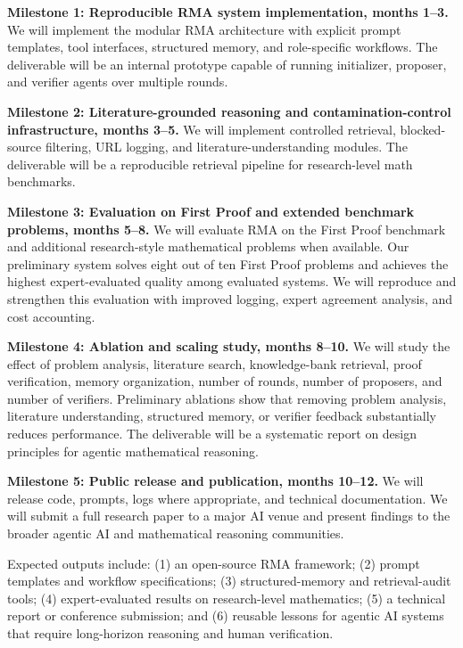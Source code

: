 \documentclass[11pt]{article}
\begin{document}
\textbf{Milestone 1: Reproducible RMA system implementation, months 1--3.} We will implement the modular RMA architecture with explicit prompt templates, tool interfaces, structured memory, and role-specific workflows. The deliverable will be an internal prototype capable of running initializer, proposer, and verifier agents over multiple rounds.

\textbf{Milestone 2: Literature-grounded reasoning and contamination-control infrastructure, months 3--5.} We will implement controlled retrieval, blocked-source filtering, URL logging, and literature-understanding modules. The deliverable will be a reproducible retrieval pipeline for research-level math benchmarks.

\textbf{Milestone 3: Evaluation on First Proof and extended benchmark problems, months 5--8.} We will evaluate RMA on the First Proof benchmark and additional research-style mathematical problems when available. Our preliminary system solves eight out of ten First Proof problems and achieves the highest expert-evaluated quality among evaluated systems. We will reproduce and strengthen this evaluation with improved logging, expert agreement analysis, and cost accounting.

\textbf{Milestone 4: Ablation and scaling study, months 8--10.} We will study the effect of problem analysis, literature search, knowledge-bank retrieval, proof verification, memory organization, number of rounds, number of proposers, and number of verifiers. Preliminary ablations show that removing problem analysis, literature understanding, structured memory, or verifier feedback substantially reduces performance. The deliverable will be a systematic report on design principles for agentic mathematical reasoning.

\textbf{Milestone 5: Public release and publication, months 10--12.} We will release code, prompts, logs where appropriate, and technical documentation. We will submit a full research paper to a major AI venue and present findings to the broader agentic AI and mathematical reasoning communities.

Expected outputs include: (1) an open-source RMA framework; (2) prompt templates and workflow specifications; (3) structured-memory and retrieval-audit tools; (4) expert-evaluated results on research-level mathematics; (5) a technical report or conference submission; and (6) reusable lessons for agentic AI systems that require long-horizon reasoning and human verification.

\vspace{-4pt}
\end{document}
